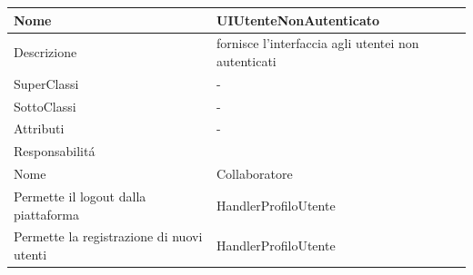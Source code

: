 \begin{center} %
    \begin{longtable}{ |p{3cm}|p{3cm}|p{3cm}|p{3cm}| }
        \hline
        Nome & \multicolumn{3}{|p{9cm}|}{UIUtenteNonAutenticato} \\\hline
        Descrizione & \multicolumn{3}{|p{9cm}|}{fornisce l'interfaccia agli utentei non autenticati} \\\hline
        SuperClassi & \multicolumn{3}{|p{9cm}|}{-} \\\hline
        SottoClassi & \multicolumn{3}{|p{9cm}|}{-} \\\hline
        Attributi & \multicolumn{3}{|p{9cm}|}{-} \\\hline
        \multicolumn{4}{|p{12cm}|}{Responsabilit\'a} \\\hline %
        \multicolumn{2}{|p{6cm}|}{Nome} & \multicolumn{2}{|p{6cm}|}{Collaboratore} \\\hline %
        \multicolumn{2}{|p{6cm}|}{Permette il logout dalla piattaforma} & \multicolumn{2}{|p{6cm}|}{HandlerProfiloUtente} \\\hline
        \multicolumn{2}{|p{6cm}|}{Permette la registrazione di nuovi utenti} & \multicolumn{2}{|p{6cm}|}{HandlerProfiloUtente} \\\hline
        
    \end{longtable}
\end{center}

        
